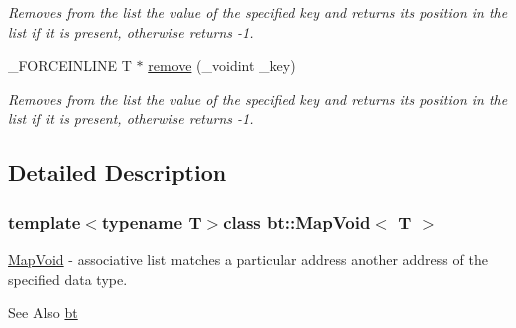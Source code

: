 \begin{DoxyCompactItemize}
\begin{DoxyCompactList}\small\item\em Removes from the list the value of the specified key and returns its position in the list if it is present, otherwise returns -\/1. \end{DoxyCompactList}\item 
\hypertarget{classbt_1_1_map_void_a0103a3b806b930616c74a0d049d7100d}{\-\_\-\-F\-O\-R\-C\-E\-I\-N\-L\-I\-N\-E T $\ast$ \hyperlink{classbt_1_1_map_void_a0103a3b806b930616c74a0d049d7100d}{remove} (\-\_\-voidint \-\_\-key)}\label{classbt_1_1_map_void_a0103a3b806b930616c74a0d049d7100d}

\begin{DoxyCompactList}\small\item\em Removes from the list the value of the specified key and returns its position in the list if it is present, otherwise returns -\/1. \end{DoxyCompactList}\end{DoxyCompactItemize}


\subsection{Detailed Description}
\subsubsection*{template$<$typename T$>$class bt\-::\-Map\-Void$<$ T $>$}

\hyperlink{classbt_1_1_map_void}{Map\-Void} -\/ associative list matches a particular address another address of the specified data type. 

\begin{DoxySeeAlso}{See Also}
\hyperlink{namespacebt}{bt} 
\end{DoxySeeAlso}
